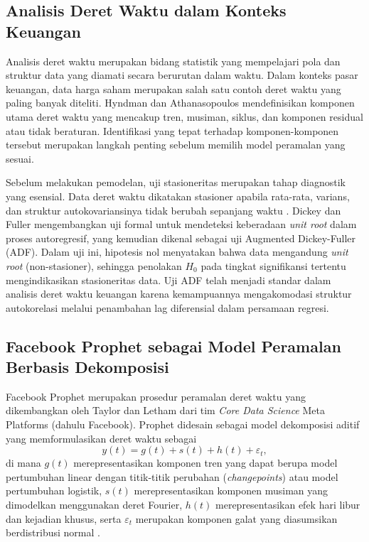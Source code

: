 \documentclass[11pt,twoside]{article}
\begin{document}
\subsection{Analisis Deret Waktu dalam Konteks Keuangan}

Analisis deret waktu merupakan bidang statistik yang mempelajari pola dan struktur data yang
diamati secara berurutan dalam waktu. Dalam konteks pasar keuangan, data harga saham
merupakan salah satu contoh deret waktu yang paling banyak diteliti. Hyndman dan
Athanasopoulos \cite{Hyndman2018} mendefinisikan komponen utama deret waktu yang mencakup
tren, musiman, siklus, dan komponen residual atau tidak beraturan. Identifikasi yang tepat
terhadap komponen-komponen tersebut merupakan langkah penting sebelum memilih model
peramalan yang sesuai.

Sebelum melakukan pemodelan, uji stasioneritas merupakan tahap diagnostik yang esensial.
Data deret waktu dikatakan stasioner apabila rata-rata, varians, dan struktur autokovariansinya
tidak berubah sepanjang waktu \cite{Hyndman2018}. Dickey dan Fuller \cite{Dickey1979}
mengembangkan uji formal untuk mendeteksi keberadaan \textit{unit root} dalam proses
autoregresif, yang kemudian dikenal sebagai uji Augmented Dickey-Fuller (ADF). Dalam uji
ini, hipotesis nol menyatakan bahwa data mengandung \textit{unit root} (non-stasioner),
sehingga penolakan $H_0$ pada tingkat signifikansi tertentu mengindikasikan stasioneritas data.
Uji ADF telah menjadi standar dalam analisis deret waktu keuangan karena kemampuannya
mengakomodasi struktur autokorelasi melalui penambahan lag diferensial dalam persamaan
regresi.

\subsection{Facebook Prophet sebagai Model Peramalan Berbasis Dekomposisi}

Facebook Prophet merupakan prosedur peramalan deret waktu yang dikembangkan oleh
Taylor dan Letham \cite{Taylor2018} dari tim \textit{Core Data Science} Meta Platforms (dahulu
Facebook). Prophet didesain sebagai model dekomposisi aditif yang memformulasikan deret
waktu sebagai
\begin{equation}
    y(t) = g(t) + s(t) + h(t) + \varepsilon_t,
    \label{Eq:Prophet}
\end{equation}
di mana $g(t)$ merepresentasikan komponen tren yang dapat berupa model pertumbuhan
linear dengan titik-titik perubahan (\textit{changepoints}) atau model pertumbuhan logistik,
$s(t)$ merepresentasikan komponen musiman yang dimodelkan menggunakan deret Fourier,
$h(t)$ merepresentasikan efek hari libur dan kejadian khusus, serta $\varepsilon_t$ merupakan
komponen galat yang diasumsikan berdistribusi normal \cite{Taylor2018}.
\end{document}
